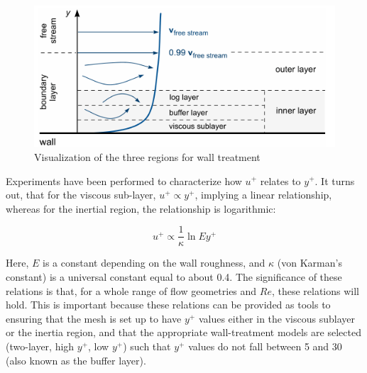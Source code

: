 \documentclass[double,12pt]{beavtex}
\begin{document}
\begin{figure}[!ht]
    \begin{center}
    	\includegraphics[width=13cm]{Figures/Velocity_Layers.PNG}
    	\caption{Visualization of the three regions for wall treatment \cite{cd-adapco}}
    	\label{fig:Velocity_Layers}
    	\end{center}
\end{figure}

Experiments have been performed to characterize how $u^{+}$ relates to $y^{+}$. It turns out, that for the viscous sub-layer, $u^{+} \propto y^{+}$, implying a linear relationship, whereas for the inertial region, the relationship is logarithmic:

\begin{equation}
    u^{+} \propto \frac{1}{\kappa} \ln{E y^{+}}
\label{eq:Inertial_Region_Relation}
\end{equation}

Here, $E$ is a constant depending on the wall roughness, and $\kappa$ (von Karman's constant) is a universal constant equal to about 0.4. The significance of these relations is that, for a whole range of flow geometries and $Re$, these relations will hold. This is important because these relations can be provided as tools to ensuring that the mesh is set up to have $y^{+}$ values either in the viscous sublayer or the inertia region, and that the appropriate wall-treatment models are selected (two-layer, high $y^{+}$, low $y^{+}$) such that $y^{+}$ values do not fall between 5 and 30 (also known as the buffer layer).
\end{document}
